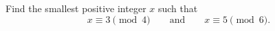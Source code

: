 Find the smallest positive integer $x$ such that
\[
x\equiv3\pmod4\qquad\text{and}\qquad x\equiv5\pmod6 .
\]
